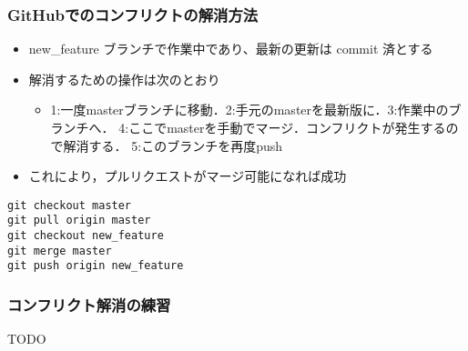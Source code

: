 \documentclass[a4paper,twoside,twocolumn]{bxjsarticle}
\begin{document}
\subsubsection{GitHubでのコンフリクトの解消方法}
\label{sec-2-4-2}
\begin{itemize}
\item new\_feature ブランチで作業中であり、最新の更新は commit 済とする

\item 解消するための操作は次のとおり
\begin{itemize}
\item 1:一度masterブランチに移動．2:手元のmasterを最新版に．3:作業中のブランチへ．
4:ここでmasterを手動でマージ．コンフリクトが発生するので解消する．
5:このブランチを再度push
\end{itemize}
\item これにより，プルリクエストがマージ可能になれば成功
\end{itemize}

\begin{verbatim}
git checkout master
git pull origin master
git checkout new_feature
git merge master
git push origin new_feature
\end{verbatim}

\subsubsection{コンフリクト解消の練習}
\label{sec-2-4-3}
TODO
\end{document}

